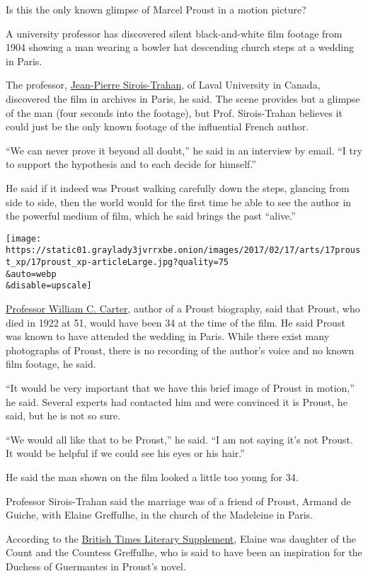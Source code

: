 Is this the only known glimpse of Marcel Proust in a motion picture?

A university professor has discovered silent black-and-white film
footage from 1904 showing a man wearing a bowler hat descending church
steps at a wedding in Paris.

The professor,
\href{http://www.lit.ulaval.ca/personnel/professeurs/sirois-trahan-jean-pierre/}{Jean-Pierre
Sirois-Trahan}, of Laval University in Canada, discovered the film in
archives in Paris, he said. The scene provides but a glimpse of the man
(four seconds into the footage), but Prof. Sirois-Trahan believes it
could just be the only known footage of the influential French author.

``We can never prove it beyond all doubt,'' he said in an interview by
email. ``I try to support the hypothesis and to each decide for
himself.''

He said if it indeed was Proust walking carefully down the steps,
glancing from side to side, then the world would for the first time be
able to see the author in the powerful medium of film, which he said
brings the past ``alive.''

\texttt{[image: https://static01.graylady3jvrrxbe.onion/images/2017/02/17/arts/17proust\_xp/17proust\_xp-articleLarge.jpg?quality=75\\\&auto=webp\\\&disable=upscale]}

\href{http://www.proust-ink.com/}{Professor William C. Carter}, author
of a Proust biography, said that Proust, who died in 1922 at 51, would
have been 34 at the time of the film. He said Proust was known to have
attended the wedding in Paris. While there exist many photographs of
Proust, there is no recording of the author's voice and no known film
footage, he said.

``It would be very important that we have this brief image of Proust in
motion,'' he said. Several experts had contacted him and were convinced
it is Proust, he said, but he is not so sure.

``We would all like that to be Proust,'' he said. ``I am not saying it's
not Proust. It would be helpful if we could see his eyes or his hair.''

He said the man shown on the film looked a little too young for 34.

Professor Sirois-Trahan said the marriage was of a friend of Proust,
Armand de Guiche, with Elaine Greffulhe, in the church of the Madeleine
in Paris.

According to the
\href{http://www.the-tls.co.uk/articles/public/proust-on-film/}{British
Times Literary Supplement}, Elaine was daughter of the Count and the
Countess Greffulhe, who is said to have been an inspiration for the
Duchess of Guermantes in Proust's novel.

